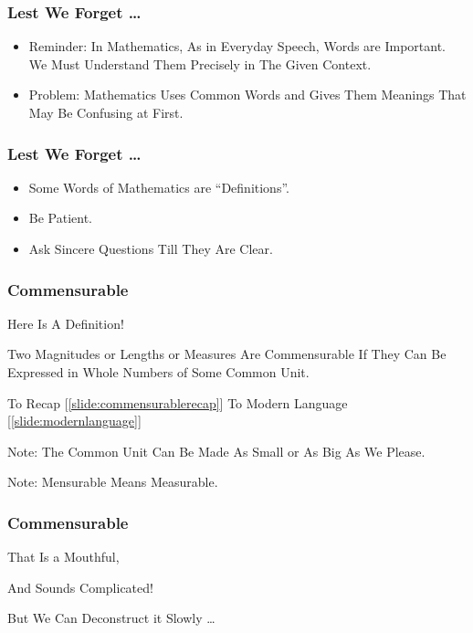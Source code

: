 \documentclass{beamer}
\begin{document}
\begin{frame}
\frametitle{Lest We Forget \dots}
\begin{itemize}
\item 
Reminder:
In Mathematics, As in Everyday Speech, Words are Important.
We Must Understand Them Precisely in The Given Context.
\pause
\item
Problem:
Mathematics Uses Common Words and Gives Them Meanings That May Be Confusing at First.
\end{itemize}
\end{frame}

\begin{frame}
\frametitle{Lest We Forget \dots}
\begin{itemize}
\item Some Words of Mathematics are ``Definitions''.
\pause
\item Be Patient. 
\pause
\item Ask Sincere Questions Till They Are Clear.
\end{itemize}
\end{frame}

\begin{frame}
\frametitle{Commensurable}
Here Is A Definition!
\pause
\begin{definition}[Commensurable]
Two Magnitudes or Lengths or Measures Are Commensurable If They Can Be Expressed in Whole Numbers of Some Common Unit.
\label{def:commensurable}
\end{definition}

{\tiny To Recap [\ref{slide:commensurablerecap}]}
{\tiny To Modern Language [\ref{slide:modernlanguage}]}

\pause
Note: The Common Unit Can Be Made As Small or As Big As We Please.

\pause

Note: Mensurable Means Measurable.
\end{frame}

\begin{frame}
\frametitle{Commensurable}
That Is a Mouthful,

\pause 

And Sounds Complicated!

\pause

But We Can Deconstruct it Slowly \dots
\end{frame}
\end{document}
